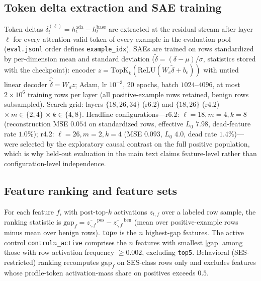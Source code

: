 \documentclass[10pt]{article} %
\newcommand{\rsix}{r6.2}
\newcommand{\rfour}{r4.2}
\begin{document}
\subsection{Token delta extraction and SAE training}
Token deltas $\delta_t^{(\ell)} = h^{\mathrm{ada}}_t - h^{\mathrm{base}}_t$
are extracted at the residual stream after layer $\ell$ for every
attention-valid token of every example in the evaluation pool
(\texttt{eval.jsonl} order defines \texttt{example\_idx}). SAEs are trained
on rows standardized by per-dimension mean and standard deviation
($\tilde\delta = (\delta-\mu)/\sigma$, statistics stored with the
checkpoint): encoder $z = \mathrm{TopK}_k(\mathrm{ReLU}(W_e\tilde\delta +
b_e))$ with untied linear decoder $\hat{\tilde\delta} = W_d z$; Adam,
lr $10^{-3}$, $20$ epochs, batch $1024$--$4096$, at most $2{\times}10^6$
training rows per layer (all positive-example rows retained, benign rows
subsampled). Search grid: layers $\{18,26,34\}$ (\rsix{}) and $\{18,26\}$
(\rfour{}) $\times\ m \in \{2,4\}$ $\times\ k \in \{4,8\}$. Headline
configurations---\rsix{}: $\ell{=}18, m{=}4, k{=}8$ (reconstruction MSE
$0.054$ on standardized rows, effective $L_0$ $7.98$, dead-feature rate
$1.0\%$); \rfour{}: $\ell{=}26, m{=}2, k{=}4$ (MSE $0.093$, $L_0$ $4.0$,
dead rate $1.4\%$)---were selected by the exploratory causal contrast on the
full positive population, which is why held-out evaluation in the main text
claims feature-level rather than configuration-level independence.

\subsection{Feature ranking and feature sets}
For each feature $f$, with post-top-$k$ activations $z_{t,f}$ over a labeled
row sample, the ranking statistic is
$\mathrm{gap}_f = \overline{z_{\cdot,f}}^{\,\mathrm{pos}} -
\overline{z_{\cdot,f}}^{\,\mathrm{ben}}$ (mean over positive-example rows
minus mean over benign rows). \texttt{top}$n$ is the $n$ highest-gap
features. The active control \texttt{control}$n$\texttt{\_active} comprises
the $n$ features with smallest $|\mathrm{gap}|$ among those with row
activation frequency $\geq 0.002$, excluding \texttt{top5}. Behavioral
(SES-restricted) ranking recomputes $\mathrm{gap}_f$ on SES-class rows only
and excludes features whose profile-token activation-mass share on positives
exceeds $0.5$.
\end{document}
